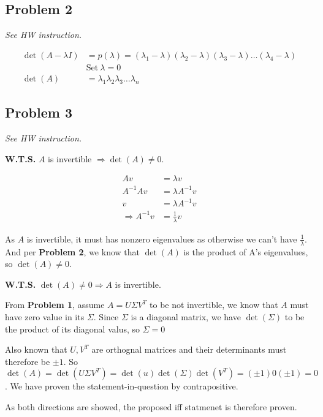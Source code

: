 \documentclass[11pt]{article}
\begin{document}
\subsection*{Problem 2}
\textit{See HW instruction.}\newline

\begin{align*}
    \det(A - \lambda I) &= p(\lambda) = (\lambda_1 - \lambda)(\lambda_2 - \lambda)(\lambda_3 - \lambda) \dots (\lambda_4 - \lambda) \\
    &\text{Set} \ \lambda = 0 \\
    \det(A) &= \lambda_1 \lambda_2 \lambda_3 \dots \lambda_n
\end{align*}


\subsection*{Problem 3}
\textit{See HW instruction.}\newline

\noindent\textbf{W.T.S.}  $A$ is invertible $\Longrightarrow \det(A) \neq 0$.


\begin{align*}
    Av &= \lambda v \\
    A^{-1} Av &=  \lambda A^{-1} v \\
    v &= \lambda A^{-1} v \\
    \Longrightarrow A^{-1} v &= \frac{1}{\lambda} v
\end{align*}

As $A$ is invertible, it must has nonzero eigenvalues as otherwise we can't have $\frac{1}{\lambda}$. And per \textbf{Problem 2}, we know that $\det(A)$ is the product of A's eigenvalues, so $\det(A) \neq 0$.\newline

\noindent\textbf{W.T.S.}  $\det(A) \neq 0 \Longrightarrow A$ is invertible.

From \textbf{Problem 1}, assume $A = U \Sigma V^T $ to be not invertible, we know that $A$ must have zero value in its $\Sigma$. Since $\Sigma$ is a diagonal matrix, we have $\det(\Sigma)$ to be the product of its diagonal valus, so $\Sigma = 0$

Also known that $U, V^T$ are orthognal matrices and their determinants must therefore be $\pm 1$. So $\det(A) = \det(U \Sigma V^T) = \det(u) \det(\Sigma)  \det(V^T) = (\pm 1) 0 (\pm 1) = 0$. We have proven the statement-in-question by contrapositive.\newline


\noindent As both directions are showed, the proposed iff statmenet is therefore proven.
\end{document}
